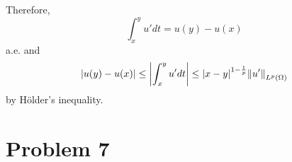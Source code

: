 \documentclass{article}
\begin{document}
Therefore,
\begin{equation*}
\int_x^y u' dt = u(y) - u(x)
\end{equation*}
a.e. and
\begin{equation*}
\abs{u(y)-u(x)}\leq \abs{\int_x^y u' dt} \leq \abs{x-y}^{1-\frac{1}{p}}\norm{u'}_{L^p(\Omega)}
\end{equation*}
by H\"older's inequality.
\section*{Problem 7}
\end{document}

